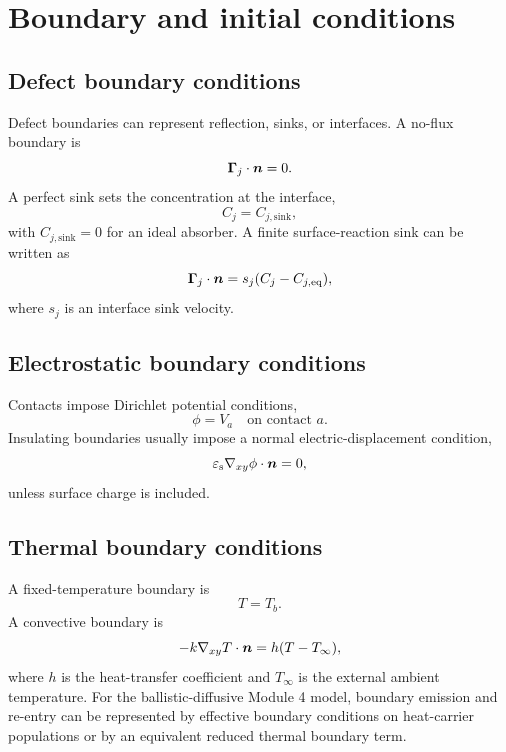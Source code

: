 \documentclass[11pt]{article}
\newcommand{\Gammavec}{\bm{\Gamma}}
\newcommand{\gradxy}{\nabla_{xy}}
\newcommand{\epss}{\varepsilon_{\mathrm{s}}}
\begin{document}
\section{Boundary and initial conditions}

\subsection{Defect boundary conditions}

Defect boundaries can represent reflection, sinks, or interfaces. A no-flux boundary is
\begin{equation}
\Gammavec_j\cdot\nvec=0.
\end{equation}
A perfect sink sets the concentration at the interface,
\begin{equation}
C_j=C_{j,\mathrm{sink}},
\end{equation}
with \(C_{j,\mathrm{sink}}=0\) for an ideal absorber. A finite surface-reaction sink can be written as
\begin{equation}
\Gammavec_j\cdot\nvec=s_j(C_j-C_{j,\mathrm{eq}}),
\end{equation}
where \(s_j\) is an interface sink velocity.

\subsection{Electrostatic boundary conditions}

Contacts impose Dirichlet potential conditions,
\begin{equation}
\phi=V_a \quad \text{on contact } a.
\end{equation}
Insulating boundaries usually impose a normal electric-displacement condition,
\begin{equation}
\epss\gradxy\phi\cdot\nvec=0,
\end{equation}
unless surface charge is included.

\subsection{Thermal boundary conditions}

A fixed-temperature boundary is
\begin{equation}
T=T_b.
\end{equation}
A convective boundary is
\begin{equation}
-k\gradxy T\cdot\nvec=h(T-T_{\infty}),
\end{equation}
where \(h\) is the heat-transfer coefficient and \(T_{\infty}\) is the external ambient temperature. For the ballistic-diffusive Module 4 model, boundary emission and re-entry can be represented by effective boundary conditions on heat-carrier populations or by an equivalent reduced thermal boundary term.
\end{document}
